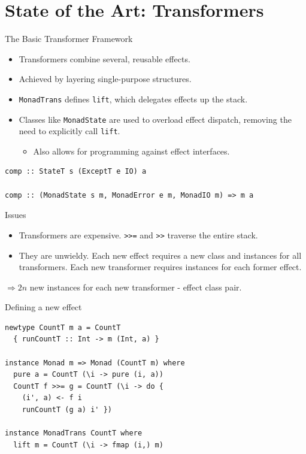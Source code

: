 \documentclass[aspectratio=169]{beamer}
\begin{document}
\section{State of the Art: Transformers}

\begin{frame}[fragile]{The Basic Transformer Framework}
  \begin{itemize}
  \item Transformers \cite{transformer-inspiration,monad-transformers} combine several, reusable effects.
  \item Achieved by layering single-purpose structures.
  \item \texttt{MonadTrans} defines \texttt{lift}, which delegates effects up
    the stack.
  \item Classes like \texttt{MonadState} are used to overload effect dispatch,
    removing the need to explicitly call \texttt{lift}.~\cite{jones-constructor-classes}
    \begin{itemize}
    \item Also allows for programming against effect interfaces.
    \end{itemize}
  \end{itemize}
  \pause
  \begin{lstlisting}
comp :: StateT s (ExceptT e IO) a

comp :: (MonadState s m, MonadError e m, MonadIO m) => m a
  \end{lstlisting}
\end{frame}

\begin{frame}{Issues}
  \begin{itemize}
  \item Transformers are expensive. \texttt{>>=} and \texttt{>>} traverse the
    entire stack.
  \item They are unwieldy. Each new effect requires a new class and instances
    for all transformers. Each new transformer requires instances for each
    former effect.
  \end{itemize}
  \pause
  \begin{block}{}
    $\Rightarrow 2n$ new instances for each new transformer - effect class pair.
  \end{block}
\end{frame}

\begin{frame}[fragile]{Defining a new effect}
  \begin{lstlisting}
newtype CountT m a = CountT
  { runCountT :: Int -> m (Int, a) }

instance Monad m => Monad (CountT m) where
  pure a = CountT (\i -> pure (i, a))
  CountT f >>= g = CountT (\i -> do {
    (i', a) <- f i
    runCountT (g a) i' })

instance MonadTrans CountT where
  lift m = CountT (\i -> fmap (i,) m)
  \end{lstlisting}
\end{frame}
\end{document}
